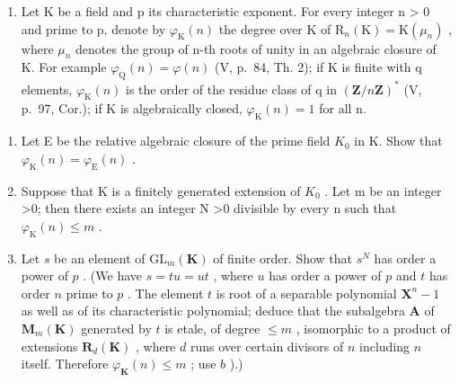 \begin{enumerate}
\def\labelenumi{\arabic{enumi})}
\setcounter{enumi}{4}
\tightlist
\item
  Let K be a field and p its characteristic exponent. For every integer n \textgreater{} 0 and prime to p, denote by \(\varphi_{\mathrm{K}}(n)\) the degree over K of \(\mathrm{R}_{n}(\mathrm{K}) = \mathrm{K}(\mu_{n})\) , where \(\mu_{n}\) denotes the group of n-th roots of unity in an algebraic closure of K. For example \(\varphi_{\mathrm{Q}}(n) = \varphi(n)\) (V, p.~84, Th. 2); if K is finite with q elements, \(\varphi_{\mathrm{K}}(n)\) is the order of the residue class of q in \((\mathbf{Z}/n\mathbf{Z})^{*}\) (V, p.~97, Cor.); if K is algebraically closed, \(\varphi_{\mathrm{K}}(n) = 1\) for all n.
\end{enumerate}

\begin{enumerate}
\def\labelenumi{\alph{enumi})}
\item
  Let E be the relative algebraic closure of the prime field \(K_{0}\) in K. Show that \(\varphi_{\mathrm{K}}(n) = \varphi_{\mathrm{E}}(n)\) .
\item
  Suppose that K is a finitely generated extension of \(K_{0}\) . Let m be an integer \textgreater0; then there exists an integer N \textgreater0 divisible by every n such that \(\varphi_{\mathrm{K}}(n) \leqslant m\) .
\item
  Let \(s\) be an element of \(\mathrm{GL}_m(\mathbf{K})\) of finite order. Show that \(s^N\) has order a power of \(p\) . (We have \(s = tu = ut\) , where \(u\) has order a power of \(p\) and \(t\) has order \(n\) prime to \(p\) . The element \(t\) is root of a separable polynomial \(\mathbf{X}^n - 1\) as well as of its characteristic polynomial; deduce that the subalgebra \(\mathbf{A}\) of \(\mathbf{M}_m(\mathbf{K})\) generated by \(t\) is etale, of degree \(\leqslant m\) , isomorphic to a product of extensions \(\mathbf{R}_d(\mathbf{K})\) , where \(d\) runs over certain divisors of \(n\) including \(n\) itself. Therefore \(\varphi_{\mathbf{K}}(n) \leqslant m\) ; use \(b\) ).)
\end{enumerate}
\relax{}
